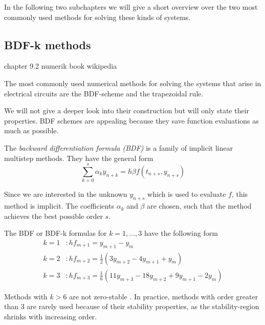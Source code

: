 In the following two subchapters we will give a short overview over the two most commonly used methods for solving these kinds of systems.

\subsection{BDF-k methods}
	\label{sec:BDFk}
	chapter 9.2 numerik book
	wikipedia
	
	The most commonly used numerical methods for solving the systems that arise in electrical circuits are the BDF-scheme and the trapezoidal rule. 
	
	We will not give a deeper look into their construction but will only state their properties. BDF schemes are appealing because they save function evaluations as much as possible.
	
	The \emph{backward differentiation formula (BDF)} is a family of implicit linear multistep methods. They have the general form
	\begin{equation}
		\sum_{k=0}^{s} \alpha_k y_{n+k} = h \beta f(t_{n+s}, y_{n+s})
	\end{equation}

	Since we are interested in the unknown $y_{n+s}$ which is used to evaluate $f$, this method is implicit. The coefficients $\alpha_k$ and $\beta$ are chosen, such that the method achieves the best possible order $s$.
	
	The BDF or BDF-k formulas for $k=1,...,3$ have the following form %
	\begin{align*}
		k = 1 &: h f_{m+1} = y_{m+1} - y_m \\
		k = 2 &: h f_{m+2} = \frac{1}{2} (3 y_{m+2} - 4 y_{m+1} + y_m) \\
		k = 3 &: h f_{m+3} = \frac{1}{6} (11 y_{m+3} - 18 y_{m+2} + 9 y_{m+1} - 2 y_m) %
	\end{align*}
	
	Methods with $k > 6$ are not zero-stable . In practice, methods with order greater than 3 are rarely used because of their stability properties, as the stability-region shrinks with increasing order.
	

